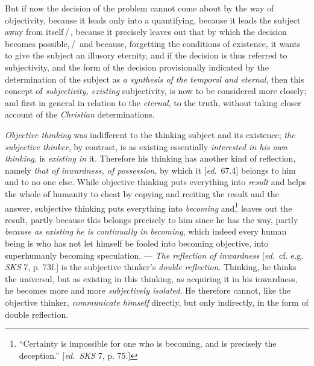 \documentclass[12pt,a4paper,openany]{book}
\newcommand{\kpage}[1]{\marginnote{\footnotesize\textit{[#1]}}}
\newcommand{\ed}[1]{{\small[\textit{ed.}\ #1]}}
\newcommand{\ins}[1]{\,/\,#1\,/\,}
\begin{document}
\kpage{111}But if now the decision of the problem cannot come about by the way
of objectivity, because it leads only into a quantifying, because it leads the
subject away from itself\ins{, because it precisely leaves out that by which the
decision becomes possible,} and because, forgetting the conditions of existence,
it wants to give the subject an illusory eternity, and if the decision is thus
referred to subjectivity, and the form of the decision provisionally indicated
by the determination of the subject as \emph{a synthesis of the temporal and
eternal}, then this concept of \emph{subjectivity, existing} subjectivity, is
now to be considered more closely; and first in general in relation to the
\emph{eternal}, to the truth, without taking closer account of the
\emph{Christian} determinations.

\emph{Objective thinking} was indifferent to the thinking subject and its
existence; \emph{the subjective thinker}, by contrast, is as existing
essentially \emph{interested in his own thinking}, is \emph{existing in} it.
Therefore his thinking has another kind of reflection, namely \emph{that of
inwardness, of possession}, by which it \ed{67.4} belongs to him and to no one
else. While objective thinking puts everything into \emph{result} and helps the
whole of humanity to cheat by copying and reciting the result and the answer,
subjective thinking puts everything into \emph{becoming}
and\footnote[41]{``Certainty is impossible for one who is becoming, and is
precisely the deception.'' \ed{\emph{SKS} 7, p. 75.}} leaves out the result,
partly because this belongs precisely to him since he has the way, partly
\emph{because as existing he is continually in becoming}, which indeed every
human being is who has not let himself be fooled into becoming objective, into
superhumanly becoming speculation. --- \emph{The reflection of inwardness}
\ed{cf. e.g. \emph{SKS} 7, p. 73f.} is the subjective thinker's \emph{double
reflection}. Thinking, he thinks the universal, but as existing in this
thinking, as acquiring it in his inwardness, he becomes more and more
\emph{subjectively isolated}. He therefore cannot, like the objective thinker,
\emph{communicate himself} directly, but only indirectly, in the form of double
reflection.
\end{document}
